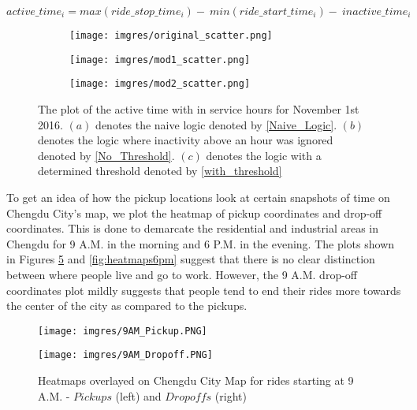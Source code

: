 \documentclass[11pt]{article}
\begin{document}
\begin{equation}
\label{with_threshold}
    active\_time_i = max(ride\_stop\_time_i) -\ min(ride\_start\_time_i)  -\ inactive\_time_i
\end{equation}



\begin{figure}
     \centering
     \begin{subfigure}[b]{0.48\textwidth}
         \centering
         \texttt{[image: imgres/original\_scatter.png]}
         \caption{}
         \label{fig:Active_Time}
     \end{subfigure}
     \hfill
     \begin{subfigure}[b]{0.48\textwidth}
         \centering
         \texttt{[image: imgres/mod1\_scatter.png]}
         \caption{}
         \label{fig:No_threshold_plot}
     \end{subfigure}
     \hfill
     \begin{subfigure}[b]{0.48\textwidth}
         \centering
         \texttt{[image: imgres/mod2\_scatter.png]}
         \caption{}
         \label{fig:With_threshold_plot}
     \end{subfigure}
        \caption{The plot of the active time with in service hours for November 1st 2016. $(a)$ denotes the naive logic denoted by \ref{Naive_Logic}. $(b)$ denotes the logic where inactivity above an hour was ignored denoted by \ref{No_Threshold}. $(c)$ denotes the logic with a determined threshold denoted by \ref{with_threshold} }
        \label{fig:three graphs}
\end{figure}
\newline

To get an idea of how the pickup locations look at certain snapshots of time on Chengdu City's map, we plot the heatmap of pickup coordinates and drop-off coordinates. This is done to demarcate the residential and industrial areas in Chengdu for 9 A.M. in the morning and 6 P.M. in the evening. The plots shown in Figures \ref{fig:heatmaps9am} and \ref{fig:heatmaps6pm} suggest that there is no clear distinction between where people live and go to work. However, the 9 A.M. drop-off coordinates plot mildly suggests that people tend to end their rides more towards the center of the city as compared to the pickups.

\begin{figure}
    \centering
    \begin{minipage}{0.45\textwidth}
        \centering
        \texttt{[image: imgres/9AM\_Pickup.PNG]} %
    \end{minipage}\hfill
    \begin{minipage}{0.45\textwidth}
        \centering
        \texttt{[image: imgres/9AM\_Dropoff.PNG]} %
    \end{minipage}
    \caption{Heatmaps overlayed on Chengdu City Map for rides starting at 9 A.M. -  $Pickups$ (left) and $\mathit{Dropoffs}$ (right) }
    \label{fig:heatmaps9am}
\end{figure}
\end{document}
